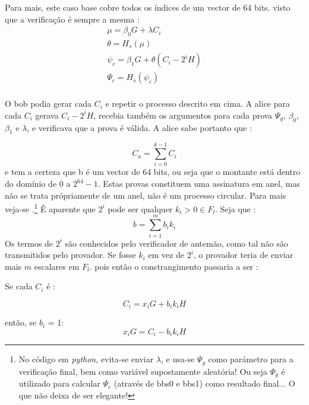 Para mais, este caso base cobre todos os índices de um vector de 64 bits.
visto que a verificação é sempre a mesma :
\begin{align*}
\mu=\beta_0 G + \lambda C_i\\
\theta= H_s(\mu)\\
\psi_c = \beta_1 G + \theta (C_i - 2^i H)\\
\Psi_c = H_s(\psi_c)\\
\end{align*}

O bob podia gerar cada $C_i$ e repetir o processo descrito em cima. A alice para cada $C_i$ gerava $C_i -2^i H$, recebia também os argumentos para cada prova $\Psi_g$, $\beta_0$, $\beta_1$ e $\lambda$, e verificava que a prova é válida.
A alice sabe portanto que :

\vspace{.175cm}
\[C_{a} = \sum_{i=0}^{k-1} C_{i} \]
\vspace{.175cm}
\newline
e tem a certeza que b é um vector de 64 bits, ou seja que o montante está dentro do domínio de 0 a $2^{64} -1$. Estas provas constituem uma assinatura em anel, mas não se trata própriamente de um anel, não é um processo circular. Para mais veja-se \cite{DangerousFreedom1984} .\footnote{No código em {\em python}, evita-se enviar $\lambda$, e usa-se $\Psi_g$ como parámetro para a verificação final, bem como variável supostamente aleatória! Ou seja $\Psi_g$ é utilizado para calcular $\Psi_c$ (através de bbs0 e bbs1) como resultado final... O que não deixa de ser elegante! }
\newline\newline\newline
É aparente que $2^i$ pode ser qualquer $k_i>0 \in F_l$.
Seja que :
\vspace{.175cm}
\[b = \sum_{i=1}^{m} b_i k_i \]
\vspace{.175cm}
\newline
Os termos de $2^i$ são conhecidos pelo verificador de antemão, como tal não são transmitidos pelo provador. Se fosse $k_i$ em vez de $2^i$, o provador teria de enviar mais $m$ escalares em $F_l$. pois então o constrangimento passaria a ser :

Se cada $C_i$ é :

\vspace{.175cm}
\[C_{i} = x_i G + b_i k_i H \]
\vspace{.175cm}

então, se $b_i$ = 1:
\vspace{.175cm}
\[x_i G = C_{i} - b_i k_i H \]
\vspace{.175cm}

